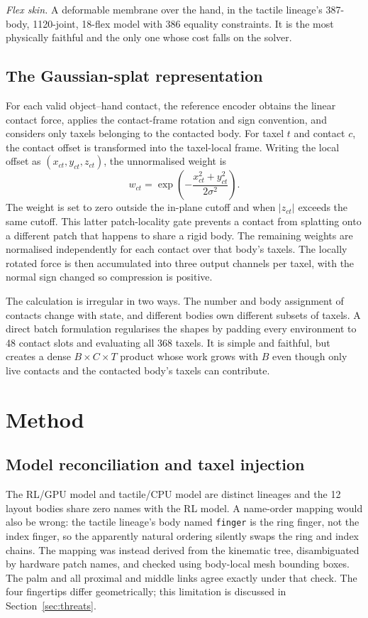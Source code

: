 \documentclass[journal]{IEEEtran}
\begin{document}
\emph{Flex skin.} A deformable membrane over the hand, in the tactile lineage's 387-body, 1120-joint, 18-flex model with 386 equality constraints. It is the most physically faithful and the only one whose cost falls on the solver.

\subsection{The Gaussian-splat representation}

For each valid object--hand contact, the reference encoder obtains the linear contact force, applies the contact-frame rotation and sign convention, and considers only taxels belonging to the contacted body. For taxel $t$ and contact $c$, the contact offset is transformed into the taxel-local frame. Writing the local offset as $(x_{ct},y_{ct},z_{ct})$, the unnormalised weight is
\begin{equation}
  w_{ct}=\exp\left(-\frac{x_{ct}^{2}+y_{ct}^{2}}{2\sigma^{2}}\right).
\end{equation}
The weight is set to zero outside the in-plane cutoff and when $|z_{ct}|$ exceeds the same cutoff. This latter patch-locality gate prevents a contact from splatting onto a different patch that happens to share a rigid body. The remaining weights are normalised independently for each contact over that body's taxels. The locally rotated force is then accumulated into three output channels per taxel, with the normal sign changed so compression is positive.

The calculation is irregular in two ways. The number and body assignment of contacts change with state, and different bodies own different subsets of taxels. A direct batch formulation regularises the shapes by padding every environment to 48 contact slots and evaluating all 368 taxels. It is simple and faithful, but creates a dense $B\times C\times T$ product whose work grows with $B$ even though only live contacts and the contacted body's taxels can contribute.

\section{Method}

\subsection{Model reconciliation and taxel injection}
\label{sec:method-model}

The RL/GPU model and tactile/CPU model are distinct lineages and the 12 layout bodies share zero names with the RL model. A name-order mapping would also be wrong: the tactile lineage's body named \texttt{finger} is the ring finger, not the index finger, so the apparently natural ordering silently swaps the ring and index chains. The mapping was instead derived from the kinematic tree, disambiguated by hardware patch names, and checked using body-local mesh bounding boxes. The palm and all proximal and middle links agree exactly under that check. The four fingertips differ geometrically; this limitation is discussed in Section~\ref{sec:threats}.
\end{document}
